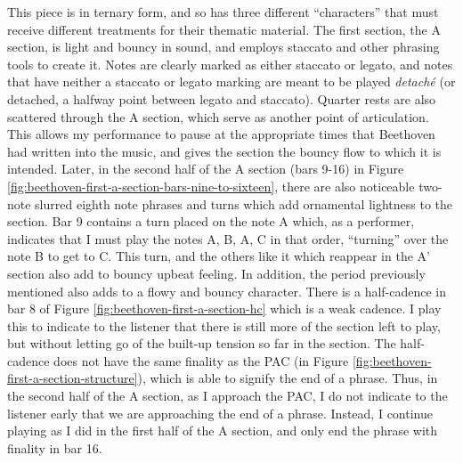 This piece is in ternary form, and so has three different ``characters'' that must receive different treatments for their thematic material. The first section, the A section, is light and bouncy in sound, and employs staccato and other phrasing tools to create it. Notes are clearly marked as either staccato or legato, and notes that have neither a staccato or legato marking are meant to be played \textit{detaché} (or detached, a halfway point between legato and staccato). Quarter rests are also scattered through the A section, which serve as another point of articulation. This allows my performance to pause at the appropriate times that Beethoven had written into the music, and gives the section the bouncy flow to which it is intended. Later, in the second half of the A section (bars 9-16) in Figure \ref{fig:beethoven-first-a-section-bars-nine-to-sixteen}\autocite{Henle_1978}, there are also noticeable two-note slurred eighth note phrases and turns which add ornamental lightness to the section. Bar 9 contains a turn placed on the note A which, as a performer, indicates that I must play the notes A, B, A, C in that order, ``turning'' over the note B to get to C. This turn, and the others like it which reappear in the A' section also add to bouncy upbeat feeling. In addition, the period previously mentioned also adds to a flowy and bouncy character. There is a half-cadence in bar 8 of Figure \ref{fig:beethoven-first-a-section-hc}\autocite{Henle_1978} which is a weak cadence. I play this to indicate to the listener that there is still more of the section left to play, but without letting go of the built-up tension so far in the section. The half-cadence does not have the same finality as the PAC (in Figure \ref{fig:beethoven-first-a-section-structure}\autocite{Henle_1978}), which is able to signify the end of a phrase. Thus, in the second half of the A section, as I approach the PAC, I do not indicate to the listener early that we are approaching the end of a phrase. Instead, I continue playing as I did in the first half of the A section, and only end the phrase with finality in bar 16. 


